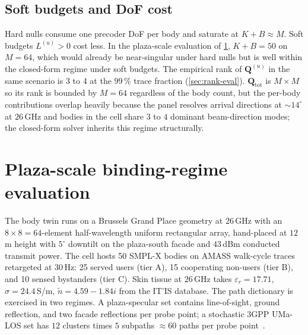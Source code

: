 \documentclass[journal,twocolumn,10pt]{IEEEtran}
\theoremstyle{plain}
\theoremstyle{remark}
\newcommand{\Qmat}{\mathbf{Q}}
\newcommand{\ntilde}{\tilde{n}}
\begin{document}
\subsection{Soft budgets and DoF cost}\label{sec:softbudget}

Hard nulls consume one precoder DoF per body and saturate at
$K + B \approx M$. Soft budgets $L^{(u)} > 0$ cost less. In the
plaza-scale evaluation of \cref{sec:eval}, $K + B = 50$ on $M = 64$,
which would already be near-singular under hard nulls but is well
within the closed-form regime under soft budgets. The empirical rank
of $\Qmat^{(u)}$ in the same scenario is 3 to 4 at the $99\,\%$
trace fraction (\cref{sec:rank-eval}). $\Qmat_{\mathrm{tot}}$ is
$M\times M$ so its rank is bounded by $M = 64$ regardless of the
body count, but the per-body contributions overlap heavily because
the panel resolves arrival directions at $\sim 14^\circ$ at
$26\,$GHz and bodies in the cell share $3$ to $4$ dominant
beam-direction modes; the closed-form solver inherits this regime
structurally.


\section{Plaza-scale binding-regime evaluation}\label{sec:eval}

The body twin runs on a Brussels Grand Place geometry at $26\,$GHz
with an $8 \times 8 = 64$-element half-wavelength uniform rectangular
array, hand-placed at $12\,$m height with $5^\circ$ downtilt on the
plaza-south facade and $43\,$dBm conducted transmit power. The cell
hosts 50 SMPL-X bodies on AMASS walk-cycle traces retargeted at
$30\,$Hz: 25 served users (tier A), 15 cooperating non-users
(tier B), and 10 sensed bystanders (tier C). Skin tissue at
$26\,$GHz takes
$\varepsilon_r = 17.71$, $\sigma = 24.4\,$S/m,
$\ntilde = 4.59 - 1.84i$ from the IT'IS database. The path
dictionary is exercised in two regimes. A plaza-specular set
contains line-of-sight, ground reflection, and two facade reflections
per probe point; a stochastic 3GPP UMa-LOS set has $12$ clusters
times $5$ subpaths $\approx 60$ paths per probe
point~\cite{TR38901}.
\end{document}
